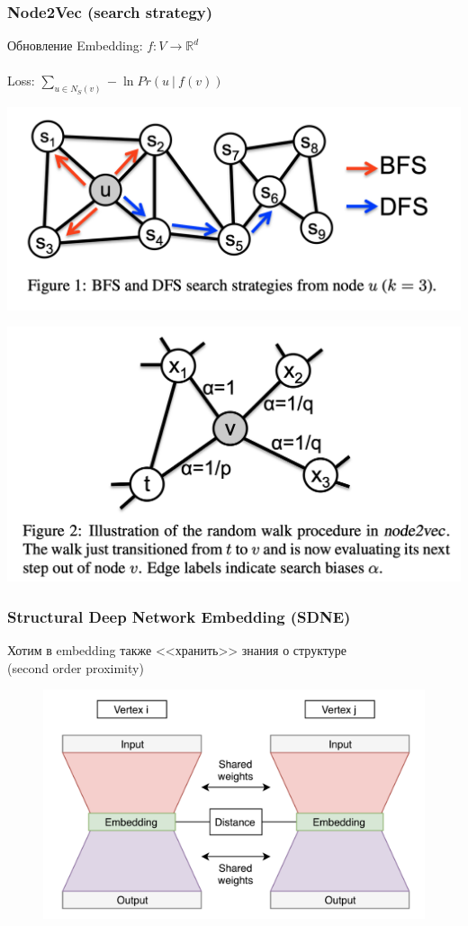 \documentclass{beamer}
\newcommand{\R}{\mathbb{R}}
\newcommand{\skipline}[0]{$ $\\}
\begin{document}
\begin{frame}
    \frametitle{Node2Vec (search strategy)}
    \begin{block}{Обновление}
        Embedding: $f: V \to \R^d$ 
        \skipline
        \skipline
        Loss: $\sum_{u \in N_S  (v)} -\ln Pr\left(u \ \vert\ f(v)\right)$
    \end{block}
    \begin{multicols}{2}
        \includegraphics[width=1\columnwidth]{bfs_dfs.png}\par 
        \includegraphics[width=1\columnwidth]{step.png}\par 
    \end{multicols}
\end{frame}

\begin{frame}
    \frametitle{Structural Deep Network Embedding (SDNE)}
    Хотим в embedding также <<хранить>> знания о структуре\\ (second order proximity)
    \begin{figure}
        \includegraphics[width=0.75\columnwidth]{SDNE.png}
    \end{figure}
\end{frame}
\end{document}
